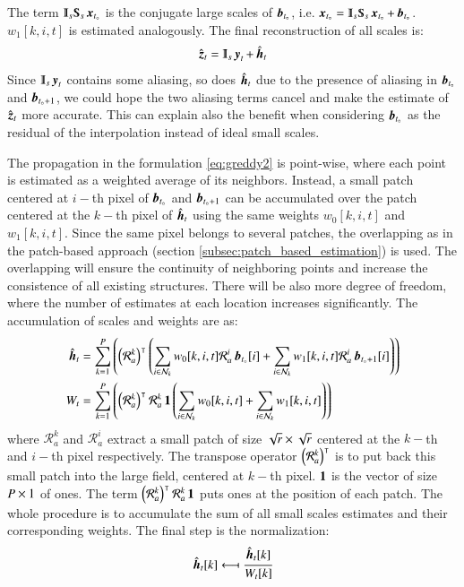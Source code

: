 The term $ \Interp_s\Sub_s\mybold{x}_{t_\knot} $ is the conjugate large scales of $ \operatorname{\boldsymbol{b}}_{t_{\circ}} $, i.e. $ \mybold{x}_{t_\knot} = \Interp_s\Sub_s\mybold{x}_{t_\knot} + \boundHF_{t_\knot} $. $ w_1[k,i,t] $ is estimated analogously. The final reconstruction of all scales is:
\begin{equation}
\myhat{\z}_t = \Interp_s \y_t + \myhat{\h}_t
\label{eq:greddy4}
\end{equation} 
Since $ \Interp_s \y_t $ contains some aliasing, so does $ \operatorname{\hat{\operatorname{\boldsymbol{h}}}}_t $ due to the presence of aliasing in $ \operatorname{\boldsymbol{b}}_{t_{\circ}} $ and $ \operatorname{\boldsymbol{b}}_{t_{\circ}+1} $, we could hope the two aliasing terms cancel and make the estimate of $ \operatorname{\hat{\operatorname{\boldsymbol{z}}}}_t $ more accurate. This can explain also the benefit when considering $ \operatorname{\boldsymbol{b}}_{t_{\circ}} $ as the residual of the interpolation instead of ideal small scales. 

The propagation in the formulation \ref{eq:greddy2} is point-wise, where each point is estimated as a weighted average of its neighbors. Instead, a small patch centered at $ i- $th pixel of $ \operatorname{\boldsymbol{b}}_{t_{\circ}} $ and $ \operatorname{\boldsymbol{b}}_{t_{\circ}+1} $ can be accumulated over the patch centered at the $ k- $th pixel of $ \hat{\operatorname{\boldsymbol{h}}}_t $ using the same weights $ w_0[k,i,t] $ and $ w_1[k,i,t] $. Since the same pixel belongs to several patches, the overlapping as in the patch-based approach (section \ref{subsec:patch_based_estimation}) is used. The overlapping will ensure the continuity of neighboring points and increase the consistence of all existing structures. There will be also more degree of freedom, where the number of estimates at each location increases significantly. The accumulation of scales and weights are as:
\begin{equation}
\begin{split}
\hat{\operatorname{\boldsymbol{h}}}_t &= \sum_{k = 1}^{P} \left( \left(\mathcal{R}_a^k\right)^{\intercal}\left(\sum_{i\in\mathcal{N}_k}w_0[k,i,t]\mathcal{R}_a^i\operatorname{\boldsymbol{b}}_{t_{\circ}}[i] + \sum_{i\in\mathcal{N}_k}w_1[k,i,t]\mathcal{R}_a^i\operatorname{\boldsymbol{b}}_{t_{\circ}+1}[i]\right) \right)\\
W_t &= \sum_{k = 1}^{P} \left(\left(\mathcal{R}_a^k\right)^{\intercal}\mathcal{R}_a^k\operatorname{\boldsymbol{1}} \left(\sum_{i\in\mathcal{N}_k}w_0[k,i,t] + \sum_{i\in\mathcal{N}_k}w_1[k,i,t]\right) \right)
\end{split}
\label{eq:greddy5}
\end{equation}
where $ \mathcal{R}_a^k $ and $ \mathcal{R}_a^i $ extract a small patch of size $ \sqrt{r} \times \sqrt{r} $ centered at the $ k- $th and $ i- $th pixel respectively. The transpose operator $ \left(\mathcal{R}_a^k\right)^{\intercal} $ is to put back this small patch into the large field, centered at $ k- $th pixel. $ \operatorname{\boldsymbol{1}} $ is the vector of size $ P \times 1 $ of ones. The term $ \left(\mathcal{R}_a^k\right)^{\intercal}\mathcal{R}_a^k\operatorname{\boldsymbol{1}} $ puts ones at the position of each patch. The whole procedure is to accumulate the sum of all small scales estimates and their corresponding weights. The final step is the normalization:
\begin{equation}
\hat{\h}_t[k] \mymapfrom \cfrac{\hat{\h}_t[k]}{W_t[k]}
\label{eq:greddy6}
\end{equation}

